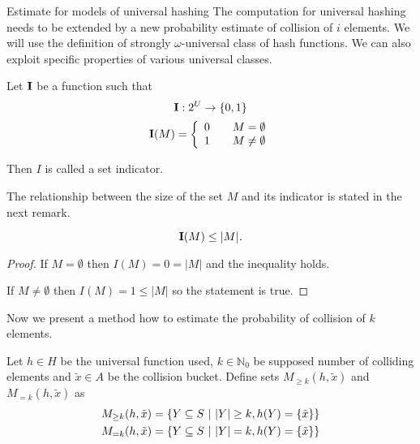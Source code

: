 \begin{section}{Estimate for models of universal hashing}
The computation for universal hashing needs to be extended by a new probability estimate of collision of $i$ elements. We will use the definition of strongly $\omega$-universal class of hash functions. We can also exploit specific properties of various universal classes.

\begin{definition}
Let $\mathbf{I}$ be a function such that
\begin{displaymath}
\mathbf{I}: 2^U \rightarrow \lbrace 0, 1 \rbrace
\end{displaymath}
\begin{displaymath}
\mathbf{I}(M) = \left\{ 
\begin{array}{l l}
  0 & \quad M = \emptyset \\
  1 & \quad M \neq \emptyset \\
\end{array} \right.
\end{displaymath}

Then $I$ is called a set indicator.
\end{definition}

The relationship between the size of the set $M$ and its indicator is stated in the next remark.
\begin{remark}
\[\mathbf{I}(M) \leq |M| \textit{.} \]
\end{remark}
\begin{proof}
If $M = \emptyset$ then $I(M) = 0 = |M|$ and the inequality holds. 

If $M \neq \emptyset$ then $I(M) = 1 \leq |M|$ so the statement is true.
\end{proof}

Now we present a method how to estimate the probability of collision of $k$ elements.
\begin{definition}
Let $h \in H$ be the universal function used, $k \in \mathbb{N}_0$ be supposed number of colliding elements and $\tilde{x} \in A$ be the collision bucket. Define sets $M_{\geq k}(h, \tilde{x})$ and $M_{= k}(h, \tilde{x})$ as
\begin{displaymath}
\begin{split}
M_{\geq k}(h, \tilde{x}) & = \{Y \subseteq S \ | \  |Y| \geq k, h(Y) = \{\tilde{x}\}\} \\
M_{= k}(h, \tilde{x}) & = \{Y \subseteq S \ | \  |Y| = k, h(Y) = \{\tilde{x}\}\} 
\end{split}
\end{displaymath}
\end{definition}


\end{section}
